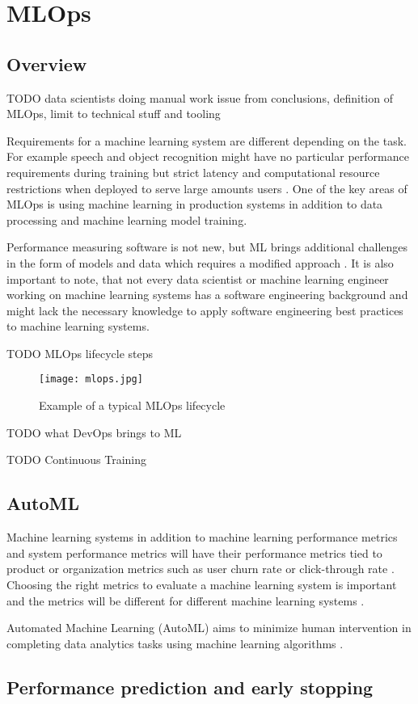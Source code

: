 \section{MLOps} %
\label{sec:mldevops}

\subsection{Overview}

TODO \parencite{kreuzbergerMachineLearningOperations2022} data scientists doing manual work issue from conclusions, definition of MLOps, limit to technical stuff and tooling

Requirements for a machine learning system are different depending on the task. For example speech and object recognition might have no particular performance requirements during training but strict latency and computational resource restrictions when deployed to serve large amounts users \parencite{hintonDistillingKnowledgeNeural2015}. One of the key areas of MLOps is using machine learning in production systems in addition to data processing and machine learning model training.

Performance measuring software is not new, but ML brings additional challenges in the form of models and data which requires a modified approach \parencite{breckMLTestScore2017a}. It is also important to note, that not every data scientist or machine learning engineer working on machine learning systems has a software engineering background \parencite{finzerDataScienceEducation2013} and might lack the necessary knowledge to apply software engineering best practices to machine learning systems.

TODO MLOps lifecycle steps

\begin{figure}[h]
    \centering
    \texttt{[image: mlops.jpg]}
    \caption{Example of a typical MLOps lifecycle}
    \label{fig:mlops}
\end{figure}

TODO what DevOps brings to ML

TODO Continuous Training

\subsection{AutoML}

Machine learning systems in addition to machine learning performance metrics and system performance metrics will have their performance metrics tied to product or organization metrics such as user churn rate or click-through rate \parencite{shankarOperationalizingMachineLearning2022}. Choosing the right metrics to evaluate a machine learning system is important and the metrics will be different for different machine learning systems \parencite{shankarOperationalizingMachineLearning2022}.

Automated Machine Learning (AutoML) aims to minimize human intervention in completing data analytics tasks using machine learning algorithms \parencite{yangIoTDataAnalytics2022}.

\subsection{Performance prediction and early stopping}

